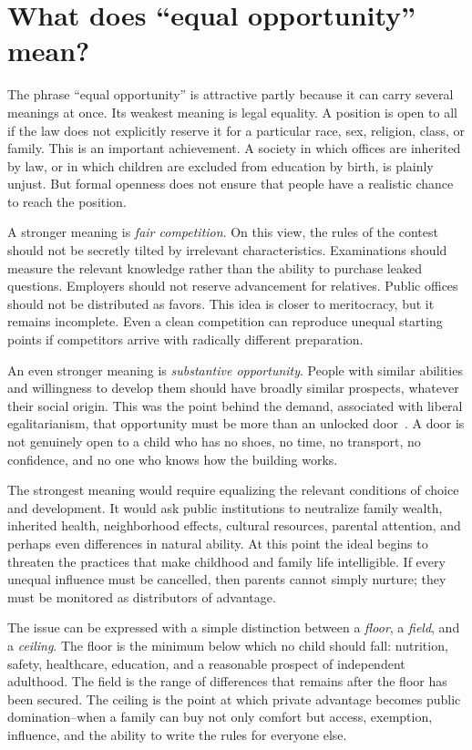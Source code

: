 ﻿\documentclass[12pt,a4paper]{book}
\begin{document}
\section{What does ``equal opportunity'' mean?}

The phrase ``equal opportunity'' is attractive partly because it can carry
several meanings at once.  Its weakest meaning is legal equality.  A
position is open to all if the law does not explicitly reserve it for a
particular race, sex, religion, class, or family.  This is an important
achievement.  A society in which offices are inherited by law, or in which
children are excluded from education by birth, is plainly unjust.  But
formal openness does not ensure that people have a realistic chance to reach
the position.

A stronger meaning is \emph{fair competition}.  On this view, the rules of
the contest should not be secretly tilted by irrelevant characteristics.
Examinations should measure the relevant knowledge rather than the ability
to purchase leaked questions.  Employers should not reserve advancement
for relatives.  Public offices should not be distributed as favors.  This
idea is closer to meritocracy, but it remains incomplete.  Even a clean
competition can reproduce unequal starting points if competitors arrive
with radically different preparation.

An even stronger meaning is \emph{substantive opportunity}.  People with
similar abilities and willingness to develop them should have broadly
similar prospects, whatever their social origin.  This was the point behind
the demand, associated with liberal egalitarianism, that opportunity must
be more than an unlocked door~\cite{Rawls1999}.  A door is not genuinely open to a child who
has no shoes, no time, no transport, no confidence, and no one who knows
how the building works.

The strongest meaning would require equalizing the relevant conditions of
choice and development.  It would ask public institutions to neutralize
family wealth, inherited health, neighborhood effects, cultural resources,
parental attention, and perhaps even differences in natural ability.  At
this point the ideal begins to threaten the practices that make childhood
and family life intelligible.  If every unequal influence must be cancelled,
then parents cannot simply nurture; they must be monitored as distributors
of advantage.

The issue can be expressed with a simple distinction between a \emph{floor},
a \emph{field}, and a \emph{ceiling}.  The floor is the minimum below which
no child should fall: nutrition, safety, healthcare, education, and a
reasonable prospect of independent adulthood.  The field is the range of
differences that remains after the floor has been secured.  The ceiling is
the point at which private advantage becomes public domination--when a
family can buy not only comfort but access, exemption, influence, and the
ability to write the rules for everyone else.
\end{document}
